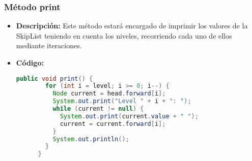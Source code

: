 \documentclass{article}
\begin{document}

  \subsubsection{Método print}
  \begin{itemize}
    \item \textbf{Descripción: }Este método estará encargado de imprimir los valores de la SkipList teniendo en cuenta los niveles, 
    recorriendo cada uno de ellos mediante iteraciones.

    \item \textbf{Código: }
    \begin{lstlisting}[language=Java, caption={Método print}]
      public void print() {
        for (int i = level; i >= 0; i--) {
          Node current = head.forward[i];
          System.out.print("Level " + i + ": ");
          while (current != null) {
            System.out.print(current.value + " ");
            current = current.forward[i];
          }
          System.out.println();
        }
      }
    \end{lstlisting}
  \end{itemize}
  
\end{document}
